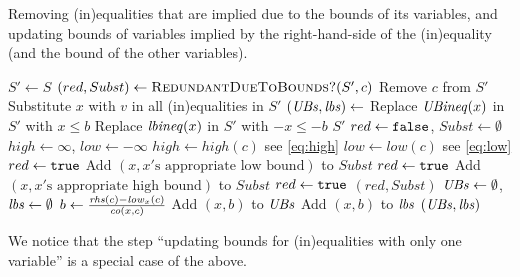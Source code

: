 \begin{algorithm}
\caption{Removing (in)equalities that are implied due to the bounds of its variables, and updating bounds of variables implied by the right-hand-side of the (in)equality (and the bound of the other variables).}
\label{alg:bounds} 
\begin{algorithmic}[1]
\State $S'\gets S$
	\State $(red, Subst) \gets \Call{RedundantDueToBounds?}{S', c}$
		\State Remove $c$ from $S'$
			\State Substitute $x$ with $v$ in all (in)equalities in $S'$
		\EndFor
	\Else
		\State $(\mathit{UBs}, \mathit{lbs})\gets$
			\State Replace $\mathit{UBineq}(x)$ in $S'$ with $x\leq b$		
		\EndFor
			\State Replace $\mathit{lbineq}(x)$ in $S'$ with $-x\leq -b$
		\EndFor
	\EndIf
\EndFor
\State\Return $S'$
\EndFunction
\Statex
{}
	\State $red \gets  \texttt{false}$, $Subst \gets \emptyset$
	\State $high\gets \infty$, $low\gets -\infty$ 
		\State $high \gets \mathit{high}(c)$ \Comment see \eqref{eq:high}
	\EndIf
		\State $low\gets \mathit{low}(c)$ \Comment see \eqref{eq:low}
	\EndIf
		\State $red \gets \texttt{true}$
			\State Add $(x, x'\text{s appropriate low bound})$ to $Subst$
		\EndFor
		\State $red \gets \texttt{true}$
			\State Add $(x, x'\text{s appropriate high bound})$ to $Subst$
		\EndFor
		\State $red \gets \texttt{true}$
	\EndIf
	\State\Return $(red, Subst)$
\EndFunction
\Statex
{}
	\State $\mathit{UBs}\gets \emptyset$, $\mathit{lbs}\gets\emptyset$
			\State $b\gets \frac{\mathit{rhs}(c)-\mathit{low}_x(c)}{\mathit{co}(x,c)}$
				\State Add $(x, b)$ to $\mathit{UBs}$
				\State Add $(x,b)$ to $\mathit{lbs}$
			\EndIf
		\EndIf
	\EndFor
	\State\Return $(\mathit{UBs},\mathit{lbs})$
\EndFunction
\end{algorithmic}
\end{algorithm}
We notice that the step ``updating bounds for (in)equalities with only one variable'' is a special case of the above.
%
